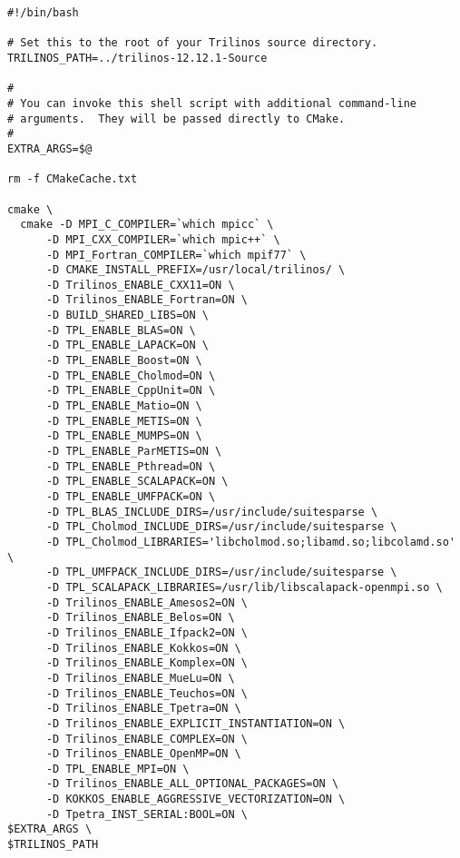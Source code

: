 \begin{verbatim}
#!/bin/bash

# Set this to the root of your Trilinos source directory.
TRILINOS_PATH=../trilinos-12.12.1-Source

#
# You can invoke this shell script with additional command-line
# arguments.  They will be passed directly to CMake.
#
EXTRA_ARGS=$@

rm -f CMakeCache.txt

cmake \
  cmake -D MPI_C_COMPILER=`which mpicc` \
      -D MPI_CXX_COMPILER=`which mpic++` \
      -D MPI_Fortran_COMPILER=`which mpif77` \
      -D CMAKE_INSTALL_PREFIX=/usr/local/trilinos/ \
      -D Trilinos_ENABLE_CXX11=ON \
      -D Trilinos_ENABLE_Fortran=ON \
      -D BUILD_SHARED_LIBS=ON \
      -D TPL_ENABLE_BLAS=ON \
      -D TPL_ENABLE_LAPACK=ON \
      -D TPL_ENABLE_Boost=ON \
      -D TPL_ENABLE_Cholmod=ON \
      -D TPL_ENABLE_CppUnit=ON \
      -D TPL_ENABLE_Matio=ON \
      -D TPL_ENABLE_METIS=ON \
      -D TPL_ENABLE_MUMPS=ON \
      -D TPL_ENABLE_ParMETIS=ON \
      -D TPL_ENABLE_Pthread=ON \
      -D TPL_ENABLE_SCALAPACK=ON \
      -D TPL_ENABLE_UMFPACK=ON \
      -D TPL_BLAS_INCLUDE_DIRS=/usr/include/suitesparse \
      -D TPL_Cholmod_INCLUDE_DIRS=/usr/include/suitesparse \
      -D TPL_Cholmod_LIBRARIES='libcholmod.so;libamd.so;libcolamd.so' \
      -D TPL_UMFPACK_INCLUDE_DIRS=/usr/include/suitesparse \
      -D TPL_SCALAPACK_LIBRARIES=/usr/lib/libscalapack-openmpi.so \
      -D Trilinos_ENABLE_Amesos2=ON \
      -D Trilinos_ENABLE_Belos=ON \
      -D Trilinos_ENABLE_Ifpack2=ON \
      -D Trilinos_ENABLE_Kokkos=ON \
      -D Trilinos_ENABLE_Komplex=ON \
      -D Trilinos_ENABLE_MueLu=ON \
      -D Trilinos_ENABLE_Teuchos=ON \
      -D Trilinos_ENABLE_Tpetra=ON \
      -D Trilinos_ENABLE_EXPLICIT_INSTANTIATION=ON \
      -D Trilinos_ENABLE_COMPLEX=ON \
      -D Trilinos_ENABLE_OpenMP=ON \
      -D TPL_ENABLE_MPI=ON \
      -D Trilinos_ENABLE_ALL_OPTIONAL_PACKAGES=ON \
      -D KOKKOS_ENABLE_AGGRESSIVE_VECTORIZATION=ON \
      -D Tpetra_INST_SERIAL:BOOL=ON \
$EXTRA_ARGS \
$TRILINOS_PATH
\end{verbatim}
